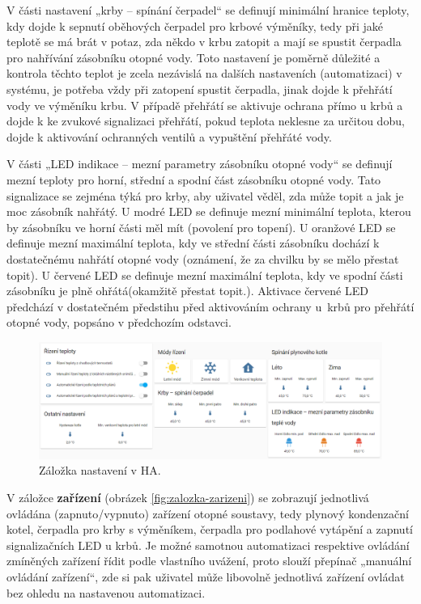 V části nastavení „krby – spínání čerpadel“ se definují minimální hranice teploty, kdy dojde k sepnutí oběhových čerpadel pro krbové výměníky, tedy při jaké teplotě se má brát v potaz, zda někdo v krbu zatopit a mají se spustit čerpadla pro nahřívání zásobníku otopné vody. Toto nastavení je poměrně důležité a kontrola těchto teplot je zcela nezávislá na dalších nastaveních (automatizaci) v systému, je potřeba vždy při zatopení spustit čerpadla, jinak dojde k přehřátí vody ve výměníku krbu. V případě přehřátí se aktivuje ochrana přímo u krbů a dojde k ke zvukové signalizaci přehřátí, pokud teplota neklesne za určitou dobu, dojde k aktivování ochranných ventilů a vypuštění přehřáté vody.


V části „LED indikace – mezní parametry zásobníku otopné vody“ se definují mezní teploty pro horní, střední a spodní část zásobníku otopné vody. Tato signalizace se zejména týká pro krby, aby uživatel věděl, zda může topit a jak je moc zásobník nahřátý. U modré LED se definuje mezní minimální teplota, kterou by zásobníku ve horní části měl mít (povolení pro topení). U oranžové LED se definuje mezní maximální teplota, kdy ve střední části zásobníku dochází k dostatečnému nahřátí otopné vody (oznámení, že za chvilku by se mělo přestat topit). U červené LED se definuje mezní maximální teplota, kdy ve spodní části zásobníku je plně ohřátá(okamžitě přestat topit.). Aktivace červené LED předchází v dostatečném předstihu před aktivováním ochrany u~krbů pro přehřátí otopné vody, popsáno v předchozím odstavci.

\begin{figure}[H]
    \centering
    \includegraphics[width=\textwidth]{images/software-ha/zalozka-nastaveni.png}
    \caption{Záložka nastavení v HA.}
    \label{fig:zalozka-nastaveni}
\end{figure}

V záložce \textbf{zařízení} (obrázek \ref{fig:zalozka-zarizeni}) se zobrazují jednotlivá ovládána (zapnuto/vypnuto) zařízení otopné soustavy, tedy plynový kondenzační kotel, čerpadla pro krby s výměníkem, čerpadla pro podlahové vytápění a zapnutí signalizačních LED u krbů. Je možné samotnou automatizaci respektive ovládání zmíněných zařízení řídit podle vlastního uvážení, proto slouží přepínač „manuální ovládání zařízení“, zde si pak uživatel může libovolně jednotlivá zařízení ovládat bez ohledu na nastavenou automatizaci.

